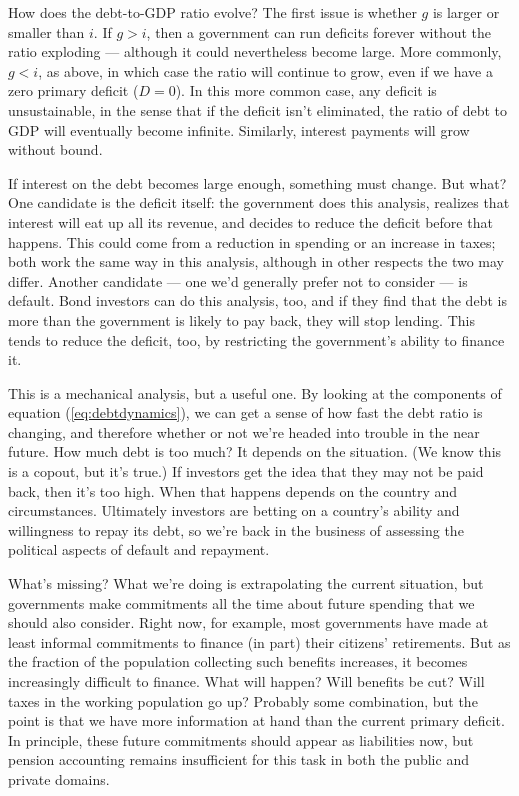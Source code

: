 \documentclass[letterpaper,12pt]{article}
\begin{document}
How does the debt-to-GDP ratio evolve?  
The first issue is whether $g$ is larger or smaller than $i$.  
If $g>i$, then a government can run deficits forever without 
the ratio exploding --- although it could nevertheless become large.  
More commonly, $ g<i$, as above, 
in which case the ratio 
will continue to grow, even if we have a zero primary deficit ($D = 0$).
In this more common case, any deficit is unsustainable, 
in the sense that if the deficit isn't eliminated, 
the ratio of debt to GDP will eventually become infinite.
Similarly, interest payments will grow without bound.


If interest on the debt becomes large enough, something must change.
But what?
One candidate is the deficit itself:  the government 
does this analysis, realizes that interest will eat up 
all its revenue, and decides to reduce the deficit before that happens.  
This could come from a reduction in spending or an increase in taxes; 
both work the same way in this analysis, 
although  in other respects the two may differ.  
Another candidate --- one we'd generally prefer not to consider 
--- is default.
Bond investors can do this analysis, too, 
and if they find that the debt is more than the government 
is likely to pay back, they will stop lending. 
This tends to reduce the deficit, too, 
by restricting the government's ability to finance it.  


This is a mechanical analysis, but a useful one. 
By looking at the components of equation (\ref{eq:debtdynamics}), 
we can get a sense of how fast the debt ratio is changing, 
and therefore whether or not we're headed into trouble in the near future.
How much debt is too much?  
It depends on the situation.
(We know this is a copout, but it's true.)
If investors get the idea that they may not be paid back, 
then it's too high.  
When that happens depends on the country and circumstances. 
Ultimately investors are betting on a country's ability and 
willingness to repay its debt, so we're back in the business 
of assessing the political aspects of default and repayment.  


What's missing?  What we're doing is extrapolating 
the current situation, but 
governments make commitments all the time about future 
spending that we should also consider. 
Right now, for example, most governments have made at least informal
commitments to finance (in part) their citizens' retirements.
But as the fraction of the population collecting such benefits
increases, it becomes increasingly difficult to finance.
What will happen?  Will benefits be cut?  
Will taxes in the working population go up?  
Probably some combination, but 
the point is that we have more information at hand than the 
current primary deficit.  
In principle, these future commitments should appear 
as liabilities now, but pension accounting remains insufficient 
for this task in both the public and private domains.  
\end{document}
